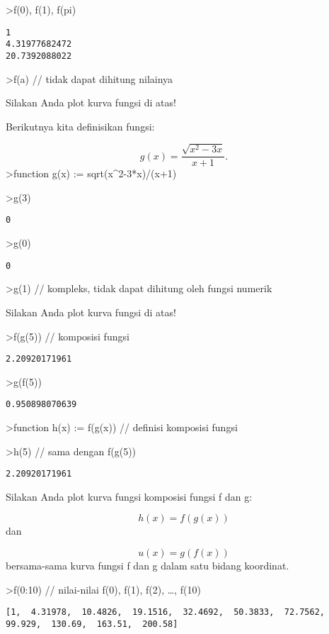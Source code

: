 \documentclass[
]{book}
\begin{document}
\textgreater f(0), f(1), f(pi)

\begin{verbatim}
1
4.31977682472
20.7392088022
\end{verbatim}

\textgreater f(a) // tidak dapat dihitung nilainya

Silakan Anda plot kurva fungsi di atas!

Berikutnya kita definisikan fungsi:

\[g(x)=\frac{\sqrt{x^2-3x}}{x+1}.\]\textgreater function g(x) := sqrt(x\^{}2-3*x)/(x+1)

\textgreater g(3)

\begin{verbatim}
0
\end{verbatim}

\textgreater g(0)

\begin{verbatim}
0
\end{verbatim}

\textgreater g(1) // kompleks, tidak dapat dihitung oleh fungsi numerik

Silakan Anda plot kurva fungsi di atas!

\textgreater f(g(5)) // komposisi fungsi

\begin{verbatim}
2.20920171961
\end{verbatim}

\textgreater g(f(5))

\begin{verbatim}
0.950898070639
\end{verbatim}

\textgreater function h(x) := f(g(x)) // definisi komposisi fungsi

\textgreater h(5) // sama dengan f(g(5))

\begin{verbatim}
2.20920171961
\end{verbatim}

Silakan Anda plot kurva fungsi komposisi fungsi f dan g:

\[h(x)=f(g(x))\]dan

\[u(x)=g(f(x))\]bersama-sama kurva fungsi f dan g dalam satu bidang koordinat.

\textgreater f(0:10) // nilai-nilai f(0), f(1), f(2), \ldots, f(10)

\begin{verbatim}
[1,  4.31978,  10.4826,  19.1516,  32.4692,  50.3833,  72.7562,
99.929,  130.69,  163.51,  200.58]
\end{verbatim}
\end{document}
